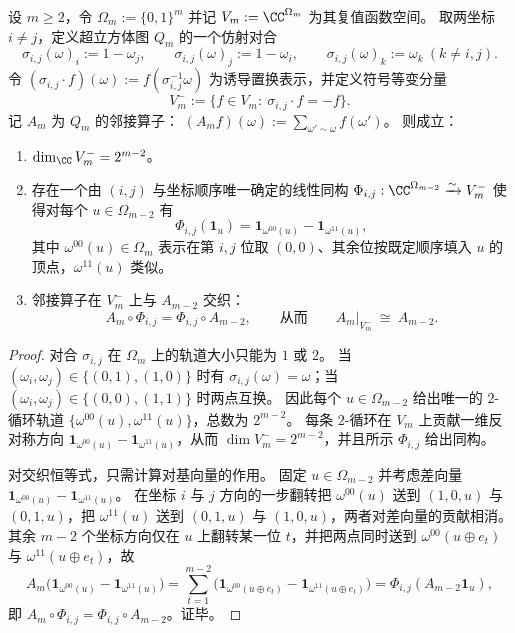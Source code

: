 \begin{theorem}[交换--取补对合诱导的手征压缩与邻接算子降维交织]\label{thm:window6-chiral-compression-hypercube-adjacency}
设 \(m\ge 2\)，令 \(\Omega_m:=\{0,1\}^m\) 并记 \(V_m:=\CC^{\Omega_m}\) 为其复值函数空间。
取两坐标 \(i\neq j\)，定义超立方体图 \(Q_m\) 的一个仿射对合
\[
\sigma_{i,j}(\omega)_i:=1-\omega_j,\qquad
\sigma_{i,j}(\omega)_j:=1-\omega_i,\qquad
\sigma_{i,j}(\omega)_k:=\omega_k\ (k\ne i,j).
\]
令 \((\sigma_{i,j}\cdot f)(\omega):=f(\sigma_{i,j}^{-1}\omega)\) 为诱导置换表示，并定义符号等变分量
\[
V_m^-:=\{f\in V_m:\ \sigma_{i,j}\cdot f=-f\}.
\]
记 \(A_m\) 为 \(Q_m\) 的邻接算子：
\(
(A_m f)(\omega):=\sum_{\omega'\sim\omega}f(\omega')
\)。
则成立：
\begin{enumerate}
  \item \(\dim_{\CC}V_m^-=2^{m-2}\)。
  \item 存在一个由 \((i,j)\) 与坐标顺序唯一确定的线性同构
  \(
  \Phi_{i,j}:\CC^{\Omega_{m-2}}\xrightarrow{\sim}V_m^-
  \)
  使得对每个 \(u\in\Omega_{m-2}\) 有
  \[
  \Phi_{i,j}(\mathbf 1_u)=\mathbf 1_{\omega^{00}(u)}-\mathbf 1_{\omega^{11}(u)},
  \]
  其中 \(\omega^{00}(u)\in\Omega_m\) 表示在第 \(i,j\) 位取 \((0,0)\)、其余位按既定顺序填入 \(u\) 的顶点，\(\omega^{11}(u)\) 类似。
  \item 邻接算子在 \(V_m^-\) 上与 \(A_{m-2}\) 交织：
  \[
  A_m\circ \Phi_{i,j}=\Phi_{i,j}\circ A_{m-2},
  \qquad\text{从而}\qquad
  A_m|_{V_m^-}\ \cong\ A_{m-2}.
  \]
\end{enumerate}
\end{theorem}
\begin{proof}
对合 \(\sigma_{i,j}\) 在 \(\Omega_m\) 上的轨道大小只能为 \(1\) 或 \(2\)。
当 \((\omega_i,\omega_j)\in\{(0,1),(1,0)\}\) 时有 \(\sigma_{i,j}(\omega)=\omega\)；当 \((\omega_i,\omega_j)\in\{(0,0),(1,1)\}\) 时两点互换。
因此每个 \(u\in\Omega_{m-2}\) 给出唯一的 \(2\)-循环轨道 \(\{\omega^{00}(u),\omega^{11}(u)\}\)，总数为 \(2^{m-2}\)。
每条 \(2\)-循环在 \(V_m\) 上贡献一维反对称方向 \(\mathbf 1_{\omega^{00}(u)}-\mathbf 1_{\omega^{11}(u)}\)，从而 \(\dim V_m^-=2^{m-2}\)，并且所示 \(\Phi_{i,j}\) 给出同构。
\par
对交织恒等式，只需计算对基向量的作用。
固定 \(u\in\Omega_{m-2}\) 并考虑差向量 \(\mathbf 1_{\omega^{00}(u)}-\mathbf 1_{\omega^{11}(u)}\)。
在坐标 \(i\) 与 \(j\) 方向的一步翻转把 \(\omega^{00}(u)\) 送到 \((1,0,u)\) 与 \((0,1,u)\)，把 \(\omega^{11}(u)\) 送到 \((0,1,u)\) 与 \((1,0,u)\)，两者对差向量的贡献相消。
其余 \(m-2\) 个坐标方向仅在 \(u\) 上翻转某一位 \(t\)，并把两点同时送到 \(\omega^{00}(u\oplus e_t)\) 与 \(\omega^{11}(u\oplus e_t)\)，故
\[
A_m\bigl(\mathbf 1_{\omega^{00}(u)}-\mathbf 1_{\omega^{11}(u)}\bigr)
=\sum_{t=1}^{m-2}\bigl(\mathbf 1_{\omega^{00}(u\oplus e_t)}-\mathbf 1_{\omega^{11}(u\oplus e_t)}\bigr)
=\Phi_{i,j}(A_{m-2}\mathbf 1_u),
\]
即 \(A_m\circ \Phi_{i,j}=\Phi_{i,j}\circ A_{m-2}\)。证毕。
\end{proof}

